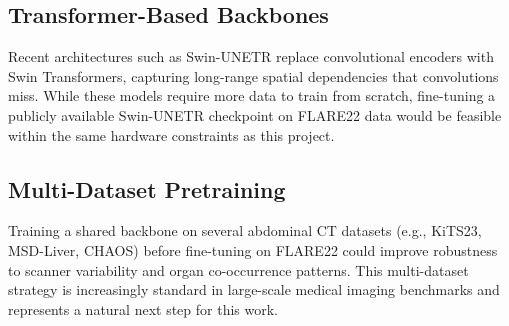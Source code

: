 \subsection{Transformer-Based Backbones}

Recent architectures such as Swin-UNETR replace convolutional encoders with Swin Transformers,
capturing long-range spatial dependencies that convolutions miss. While these models require
more data to train from scratch, fine-tuning a publicly available Swin-UNETR checkpoint on
FLARE22 data would be feasible within the same hardware constraints as this project.

\subsection{Multi-Dataset Pretraining}

Training a shared backbone on several abdominal CT datasets (e.g., KiTS23, MSD-Liver,
CHAOS) before fine-tuning on FLARE22 could improve robustness to scanner variability and
organ co-occurrence patterns. This multi-dataset strategy is increasingly standard in
large-scale medical imaging benchmarks and represents a natural next step for this work.
